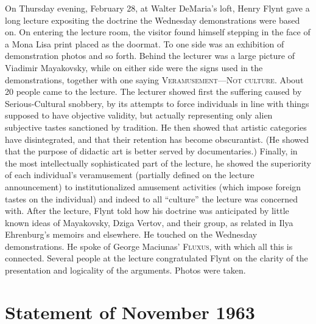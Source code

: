 On Thursday evening, February 28, at Walter DeMaria's loft, Henry Flynt 
gave a long lecture expositing the doctrine the Wednesday demonstrations 
were based on. On entering the lecture room, the visitor found himself 
stepping in the face of a Mona Lisa print placed as the doormat. To one side 
was an exhibition of demonstration photos and so forth. Behind the lecturer 
was a large picture of Viadimir Mayakovsky, while on either side were the 
signs used in the demonstrations, together with one saying 
\textsc{Veramusement---Not culture}. About 20 people came to the lecture. 
The lecturer showed first the suffering caused by Serious-Cultural snobbery, 
by its attempts to force individuals in line with things supposed to have 
objective validity, but actually representing only alien subjective tastes 
sanctioned by tradition. He then showed that artistic categories have 
disintegrated, and that their retention has become obscurantist. (He showed 
that the purpose of didactic art is better served by documentaries.) Finally, 
in the most intellectually sophisticated part of the lecture, he showed the 
superiority of each individual's veramusement (partially defined on the 
lecture announcement) to institutionalized amusement activities (which 
impose foreign tastes on the individual) and indeed to all \enquote{culture} the 
lecture was concerned with. After the lecture, Flynt told how his doctrine 
was anticipated by little known ideas of Mayakovsky, Dziga Vertov, and 
their group, as related in Ilya Ehrenburg's memoirs and elsewhere. He 
touched on the Wednesday demonstrations. He spoke of George Maciunas' 
\textsc{Fluxus}, with which all this is connected. Several people at the lecture 
congratulated Flynt on the clarity of the presentation and logicality of the 
arguments. Photos were taken. 

\vfill

\section*{\normalsize Statement of November 1963}

